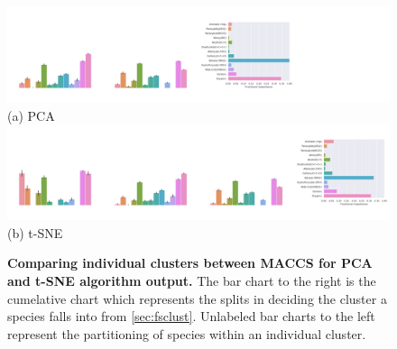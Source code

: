 \begin{landscape}
\begin{figure}[H]

         \includegraphics[width=1.65\textheight]{./outputs/PCA/maccs/group.png}
         \\ (a) PCA \\
     \hfill
            \includegraphics[width=1.65\textheight]{./outputs/t-SNE/maccs/group.png}
        \\ (b) t-SNE
        \caption{ \textbf{Comparing individual clusters between MACCS for PCA and t-SNE algorithm output.} The bar chart to the right is the cumelative chart which represents the splits in deciding the cluster a species falls into from \autoref{sec:fsclust}. Unlabeled bar charts to the left represent the partitioning of species within an individual cluster.}
        \label{fig:biMACCS}
\end{figure}
\end{landscape}



